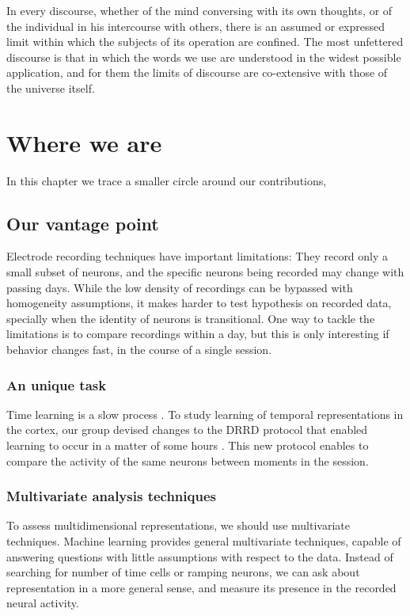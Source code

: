 \begin{savequote}[75mm]
In every discourse, whether of the mind conversing with its own thoughts, or of the individual in his intercourse with others, there is an assumed or expressed limit within which the subjects of its operation are confined. The most unfettered discourse is that in which the words we use are understood in the widest possible application, and for them the limits of discourse are co-extensive with those of the universe itself.
\end{savequote}

\chapter{Where we are}
\label{chap:where}

In this chapter we trace a smaller circle around our contributions, 


\section{Our vantage point}
Electrode recording techniques have important limitations: They record only a small subset of neurons, and the specific neurons being recorded may change with passing days. While the low density of recordings can be bypassed with homogeneity assumptions, it makes harder to test hypothesis on recorded data, specially when the identity of neurons is transitional. One way to tackle the limitations is to compare recordings within a day, but this is only interesting if behavior changes fast, in the course of a single session. 

    \subsection{An unique task}
        Time learning is a slow process \cite{paton2018neural}. To study learning of temporal representations in the cortex, our group devised changes to the DRRD protocol that enabled learning to occur in a matter of some hours \cite{}. This new protocol enables to compare the activity of the same neurons between moments in the session. 
    
    \subsection{Multivariate analysis techniques}
        To assess multidimensional representations, we should use multivariate techniques. Machine learning provides general multivariate techniques, capable of answering questions with little assumptions with respect to the data. Instead of searching for number of time cells or ramping neurons, we can ask about representation in a more general sense, and measure its presence in the recorded neural activity. 


